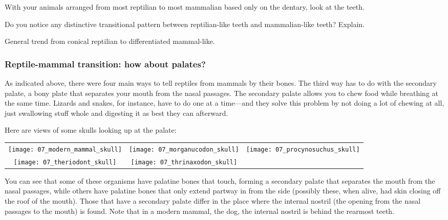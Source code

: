 \documentclass[12pt, hidelinks]{exam}
\newcommand*\AnswerBox[2]{%
    \parbox[t][#1]{0.92\textwidth}{%
    \begin{solution}#2\end{solution}}
}
\begin{document}
With your animals arranged from most reptilian to most mammalian based
only on the dentary, look at the teeth.

\begin{questions}

\question
Do you notice any distinctive transitional pattern between
reptilian-like teeth and mammalian-like teeth? Explain.

\AnswerBox{2\baselineskip}{%
General trend from conical reptilian to differentiated mammal-like.
}

\subsubsection*{Reptile-mammal transition: how about palates?}

As indicated above, there were four main ways to tell reptiles from
mammals by their bones.  The third way has to do with the secondary palate, a bony plate that
separates your mouth from the nasal passages. The secondary palate
allows you to chew food while breathing at the same time. Lizards and
snakes, for instance, have to do one at a time—and they solve this
problem by not doing a lot of chewing at all, just swallowing stuff
whole and digesting it as best they can afterward.

Here are views of some skulls looking up at the palate:

\begin{tabular}{@{}ccc@{}}
\texttt{[image: 07\_modern\_mammal\_skull]} &
\texttt{[image: 07\_morganucodon\_skull]} &
\texttt{[image: 07\_procynosuchus\_skull]} \\

\texttt{[image: 07\_theriodont\_skull]} &
\texttt{[image: 07\_thrinaxodon\_skull]} &
\\
\end{tabular}

You can see that some of these organisms have palatine bones that touch,
forming a secondary palate that separates the mouth from the nasal
passages, while others have palatine bones that only extend partway in
from the side (possibly these, when alive, had skin closing off the roof
of the mouth). Those that have a secondary palate differ in the place
where the internal nostril (the opening from the nasal passages to the
mouth) is found. Note that in a modern mammal, the dog, the internal
nostril is behind the rearmost teeth.


\end{questions}
\end{document}
